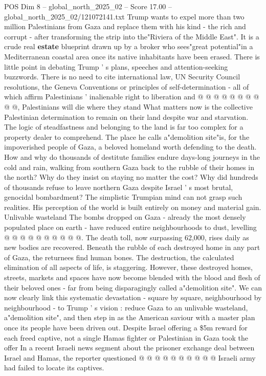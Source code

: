 \begin{textsample}{POS Dim 8 – global\_north\_2025\_02 – Score 17.00 – global\_north\_2025\_02/121072141.txt}
Trump wants to expel more than two million Palestinians from Gaza and replace them with his kind - the rich and corrupt - after transforming the strip into the"Riviera of the Middle East".
It is a crude real \textbf{estate} blueprint drawn up by a broker who sees"great potential"in a Mediterranean coastal area once its native inhabitants have been erased.
There is little point in debating Trump ' s plans, speeches and attention-seeking buzzwords.
There is no need to cite international law, UN Security Council resolutions, the Geneva Conventions or principles of self-determination - all of which affirm Palestinians ' inalienable right to liberation and @ @ @ @ @ @ @ @ @ @, Palestinians will die where they stand What matters now is the collective Palestinian determination to remain on their land despite war and starvation.
The logic of steadfastness and belonging to the land is far too complex for a property dealer to comprehend.
The place he calls a"demolition site"is, for the impoverished people of Gaza, a beloved homeland worth defending to the death.
How and why do thousands of destitute families endure days-long journeys in the cold and rain, walking from southern Gaza back to the rubble of their homes in the north?
Why do they insist on staying no matter the cost?
Why did hundreds of thousands refuse to leave northern Gaza despite Israel ' s most brutal, genocidal bombardment?
The simplistic Trumpian mind can not grasp such realities.
His perception of the world is built entirely on money and material gain.
Unlivable wasteland The bombs dropped on Gaza - already the most densely populated place on earth - have reduced entire neighbourhoods to dust, levelling @ @ @ @ @ @ @ @ @ @.
The death toll, now surpassing 62,000, rises daily as new bodies are recovered.
Beneath the rubble of each destroyed home in any part of Gaza, the returnees find human bones.
The destruction, the calculated elimination of all aspects of life, is staggering.
However, these destroyed homes, streets, markets and spaces have now become blended with the blood and flesh of their beloved ones - far from being disparagingly called a"demolition site".
We can now clearly link this systematic devastation - square by square, neighbourhood by neighbourhood - to Trump ' s vision : reduce Gaza to an unlivable wasteland, a"demolition site", and then step in as the American saviour with a master plan once its people have been driven out.
Despite Israel offering a \$5m reward for each freed captive, not a single Hamas fighter or Palestinian in Gaza took the offer In a recent Israeli news segment about the prisoner exchange deal between Israel and Hamas, the reporter questioned @ @ @ @ @ @ @ @ @ @ Israeli army had failed to locate its captives.

\end{textsample}
